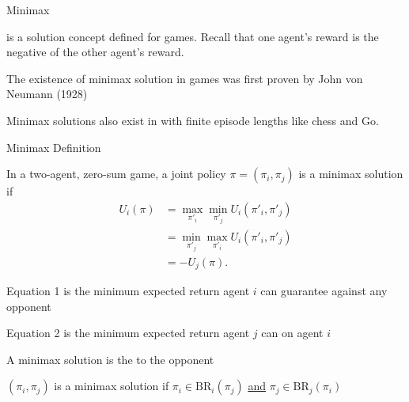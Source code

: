 \begin{frame}{Minimax}

     is a solution concept defined for  games. Recall that one agent's reward is the negative of the other agent's reward.
    \blist
        \item The existence of minimax solution in  games was first proven by John von Neumann (1928)
        \item Minimax solutions also exist in with finite episode lengths like chess and Go. 
    \elist
    
\end{frame}

\begin{frame}{Minimax Definition}

    In a two-agent, zero-sum game, a joint policy \(\pi = (\pi_i, \pi_j)\) is a minimax solution if
    \vspace{2pt}
    \begin{align}
        U_i(\pi) &= \max_{\pi'_i} \min_{\pi'_j} U_i(\pi'_i, \pi'_j) \\
        &= \min_{\pi'_j} \max_{\pi'_i} U_i(\pi'_i, \pi'_j) \\
        &= -U_j(\pi).
    \end{align}

    \blist
        \item Equation 1 is the minimum expected return agent \(i\) can guarantee against any opponent
        \item Equation 2 is the minimum expected return agent \(j\) can  on agent \(i\)
        \item A minimax solution is the  to the  opponent
        \item \((\pi_i, \pi_j)\) is a minimax solution if \(\pi_i \in \text{BR}_i(\pi_j)\) \underline{and} \(\pi_j \in \text{BR}_j(\pi_i)\)
    \elist
      
\end{frame}

